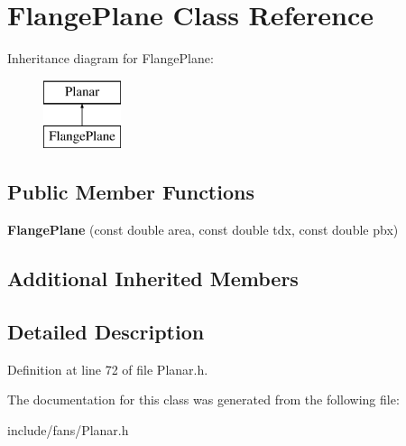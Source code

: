 \hypertarget{class_flange_plane}{}\section{Flange\+Plane Class Reference}
\label{class_flange_plane}
Inheritance diagram for Flange\+Plane\+:\begin{figure}[H]
\begin{center}
\leavevmode
\includegraphics[height=2.000000cm]{d0/de9/class_flange_plane}
\end{center}
\end{figure}
\subsection*{Public Member Functions}
\begin{DoxyCompactItemize}
\item 
\mbox{\label{class_flange_plane_a124814f4e579d4e0b415190e144147e6}} 
{\bfseries Flange\+Plane} (const double area, const double tdx, const double pbx)
\end{DoxyCompactItemize}
\subsection*{Additional Inherited Members}


\subsection{Detailed Description}


Definition at line 72 of file Planar.\+h.



The documentation for this class was generated from the following file\+:\begin{DoxyCompactItemize}
\item 
include/fans/Planar.\+h\end{DoxyCompactItemize}
